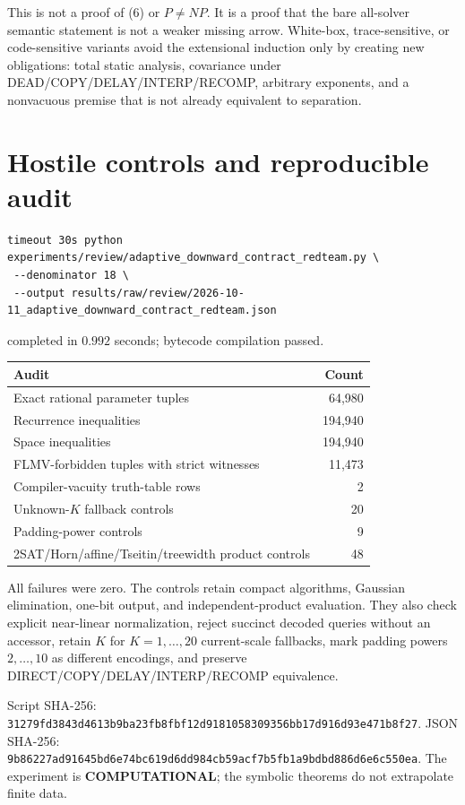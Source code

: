 \documentclass[11pt]{article}
\newcommand{\COMP}{\textbf{COMPUTATIONAL}}
\begin{document}
This is not a proof of (6) or $P\ne NP$.  It is a proof that the bare
all-solver semantic statement is not a weaker missing arrow.  White-box,
trace-sensitive, or code-sensitive variants avoid the extensional induction
only by creating new obligations: total static analysis, covariance under
DEAD/COPY/DELAY/INTERP/RECOMP, arbitrary exponents, and a nonvacuous premise
that is not already equivalent to separation.

\section{Hostile controls and reproducible audit}

\begin{verbatim}
timeout 30s python experiments/review/adaptive_downward_contract_redteam.py \
 --denominator 18 \
 --output results/raw/review/2026-10-11_adaptive_downward_contract_redteam.json
\end{verbatim}
completed in $0.992$ seconds; bytecode compilation passed.

\begin{center}
\begin{tabular}{lr}
\toprule Audit & Count\\ \midrule
Exact rational parameter tuples & 64,980\\
Recurrence inequalities & 194,940\\
Space inequalities & 194,940\\
FLMV-forbidden tuples with strict witnesses & 11,473\\
Compiler-vacuity truth-table rows & 2\\
Unknown-$K$ fallback controls & 20\\
Padding-power controls & 9\\
2SAT/Horn/affine/Tseitin/treewidth product controls & 48\\
\bottomrule
\end{tabular}
\end{center}

All failures were zero.  The controls retain compact algorithms, Gaussian
elimination, one-bit output, and independent-product evaluation.  They also
check explicit near-linear normalization, reject succinct decoded queries
without an accessor, retain $K$ for $K=1,\ldots,20$ current-scale fallbacks,
mark padding powers $2,\ldots,10$ as different encodings, and preserve
DIRECT/COPY/DELAY/INTERP/RECOMP equivalence.

Script SHA-256:
\nolinkurl{31279fd3843d4613b9ba23fb8fbf12d9181058309356bb17d916d93e471b8f27}.
JSON SHA-256:
\nolinkurl{9b86227ad91645bd6e74bc619d6dd984cb59acf7b5fb1a9bdbd886d6e6c550ea}.
The experiment is \COMP; the symbolic theorems do not extrapolate finite data.
\end{document}
